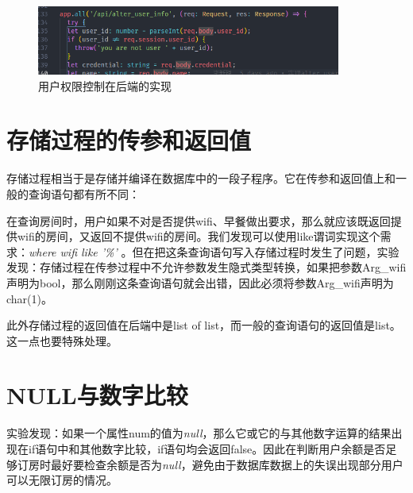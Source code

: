 \documentclass{myreport}
\begin{document}
\begin{figure}[htp]
    \centering
    \includegraphics[width=10cm]{figure/2018-12-22-13-03-10.png}
    \caption{用户权限控制在后端的实现}
    \label{fig:right-control}
\end{figure}

\section{存储过程的传参和返回值}
存储过程相当于是存储并编译在数据库中的一段子程序。它在传参和返回值上和一般的查询语句都有所不同：

在查询房间时，用户如果不对是否提供wifi、早餐做出要求，那么就应该既返回提供wifi的房间，又返回不提供wifi的房间。我们发现可以使用like谓词实现这个需求：\textit{where \space wifi \space like \space '\%'} 。但在把这条查询语句写入存储过程时发生了问题，实验发现：存储过程在传参过程中不允许参数发生隐式类型转换，如果把参数Arg\_wifi声明为bool，那么刚刚这条查询语句就会出错，因此必须将参数Arg\_wifi声明为char(1)。

此外存储过程的返回值在后端中是list of list，而一般的查询语句的返回值是list。这一点也要特殊处理。


\section{NULL与数字比较}
实验发现：如果一个属性num的值为\textit{null}，那么它或它的与其他数字运算的结果出现在if语句中和其他数字比较，if语句均会返回false。因此在判断用户余额是否足够订房时最好要检查余额是否为\textit{null}，避免由于数据库数据上的失误出现部分用户可以无限订房的情况。


\end{document}
